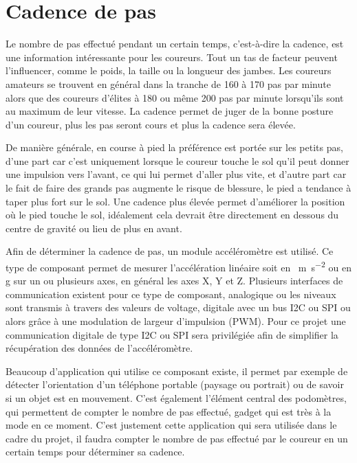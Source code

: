 \section{Cadence de pas}

Le nombre de pas effectué pendant un certain temps, c’est-à-dire la cadence, est une information intéressante pour les coureurs. Tout un tas de facteur peuvent l’influencer, comme le poids, la taille ou la longueur des jambes. Les coureurs amateurs se trouvent en général dans la tranche de 160 à 170 pas par minute alors que des coureurs d’élites à 180 ou même 200 pas par minute lorsqu’ils sont au maximum de leur vitesse. La cadence permet de juger de la bonne posture d’un coureur, plus les pas seront cours et plus la cadence sera élevée. 

De manière générale, en course à pied la préférence est portée sur les petits pas, d’une part car c’est uniquement lorsque le coureur touche le sol qu’il peut donner une impulsion vers l’avant, ce qui lui permet d’aller plus vite, et d’autre part car le fait de faire des grands pas augmente le risque de blessure, le pied a tendance à taper plus fort sur le sol. Une cadence plus élevée permet d’améliorer la position où le pied touche le sol, idéalement cela devrait être directement en dessous du centre de gravité ou lieu de plus en avant.

Afin de déterminer la cadence de pas, un module accéléromètre est utilisé. Ce type de composant permet de mesurer l’accélération linéaire soit en \SI{}{\m\per\square\s} ou en g sur un ou plusieurs axes, en général les axes X, Y et Z. Plusieurs interfaces de communication existent pour ce type de composant, analogique ou les niveaux sont transmis à travers des valeurs de voltage, digitale avec un bus I2C ou SPI ou alors grâce à une modulation de largeur d’impulsion (PWM). Pour ce projet une communication digitale de type I2C ou SPI sera privilégiée afin de simplifier la récupération des données de l’accéléromètre.

Beaucoup d’application qui utilise ce composant existe, il permet par exemple de détecter l’orientation d’un téléphone portable (paysage ou portrait) ou de savoir si un objet est en mouvement. C’est également l’élément central des podomètres, qui permettent de compter le nombre de pas effectué, gadget qui est très à la mode en ce moment. C’est justement cette application qui sera utilisée dans le cadre du projet, il faudra compter le nombre de pas effectué par le coureur en un certain temps pour déterminer sa cadence.

